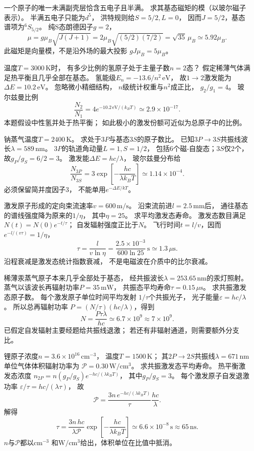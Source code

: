 一个原子的唯一未满副壳层恰含五电子且半满。
求其基态磁矩的模（以玻尔磁子表示）。
\exsolution
半满五电子只能为$d^5$，
洪特规则给$S=5/2,L=0$，
因而$J=5/2$，基态谱项为\({}^{6}S_{5/2}\)。
纯S态朗德因子$g=2$，
\[
 \boxed{\mu=g\mu_B\sqrt{J(J+1)}
 =2\mu_B\sqrt{(5/2)(7/2)}
 =\sqrt{35}\,\mu_B\simeq5.92\mu_B}.
\]
\excheck 此磁矩是向量模，不是沿外场的最大投影
$gJ\mu_B=5\mu_B$。

温度$T=3000\,\mathrm K$时，
有多少比例的氢原子处于主量子数$n=2$态？
假定稀薄气体满足热平衡且几乎全部在基态。
\exsolution
氢能级$E_n=-13.6/n^2\,\mathrm{eV}$，
故$1\to2$激发能为$\Delta E=10.2\,\mathrm{eV}$。
忽略微小精细结构，
$n$级统计权重与$n^2$成正比，
$g_2/g_1=4$。
玻尔兹曼比例
\[
 \boxed{\frac{N_2}{N_1}=
 4e^{-10.2\,\mathrm{eV}/(k_BT)}
 \simeq2.9\times10^{-17}}.
\]
\excheck 本题假设中性氢并处于热平衡；
如此极小的激发份额可近似为总原子中的比例。

钠蒸气温度$T=2400\,\mathrm K$。
求处于$3P$与基态$3S$的原子数比。
已知$3P\to3S$共振线波长$\lambda=589\,\mathrm{nm}$。
\exsolution
$3P$的轨道角动量$L=1,S=1/2$，
包括6个磁-自旋态；$3S$仅2个，
故$g_P/g_S=6/2=3$。
激发能$\Delta E=hc/\lambda$，
玻尔兹曼分布给
\[
 \boxed{\frac{N_{3P}}{N_{3S}}=
 3\exp\!\left[-\frac{hc}{\lambda k_BT}\right]
 \simeq1.14\times10^{-4}}.
\]
\excheck 必须保留简并度因子3，
不能单用$e^{-\Delta E/kT}$。

激发原子形成的定向束流速率$v=600\,\mathrm{m/s}$。
沿束流前进$l=2.5\,\mathrm{mm}$后，
通往基态的谱线强度降为原来的$1/\eta$，
其中$\eta=25$。
求平均激发态寿命。
\exsolution
激发态数目满足
$N(t)=N(0)e^{-t/\tau}$；
自发辐射强度正比于$N$。
飞行时间$t=l/v$，因而
$e^{-l/(v\tau)}=1/\eta$，
\[
 \boxed{\tau=\frac l{v\ln\eta}
 =\frac{2.5\times10^{-3}}
 {600\ln25}\,\mathrm s\simeq1.3\,\mu\mathrm s}.
\]
\excheck 沿程衰减是激发态统计指数衰减，
不是电磁波在介质中的比尔衰减。

稀薄汞蒸气原子本来几乎全部处于基态，
经共振波长$\lambda=253.65\,\mathrm{nm}$的汞灯照射。
蒸气以该波长再辐射功率$P=35\,\mathrm{mW}$，
共振态平均寿命$\tau=0.15\,\mu\mathrm s$。
求共振激发态原子数。
\exsolution
每个激发原子单位时间平均发射
$1/\tau$个共振光子，
光子能量$\varepsilon=hc/\lambda$。
所以总再辐射功率
$P=(N/\tau)(hc/\lambda)$，得到
\[
 \boxed{N=\frac{P\tau\lambda}{hc}
 \simeq6.7\times10^{9}\approx7\times10^9}.
\]
\excheck 已假定自发辐射主要经题给共振线退激；
若还有非辐射通道，则需要额外分支比。

锂原子浓度$n=3.6\times10^{16}\,\mathrm{cm^{-3}}$，
温度$T=1500\,\mathrm K$；
其$2P\to2S$共振线$\lambda=671\,\mathrm{nm}$
单位气体体积辐射功率为
$\mathcal P=0.30\,\mathrm{W/cm^3}$。
求共振激发态平均寿命。
\exsolution
热平衡激发态浓度
$n_{2P}=n(g_P/g_S)e^{-hc/(\lambda k_BT)}$，
其中$g_P/g_S=3$。
每个激发原子自发退激功率
$\varepsilon/\tau=hc/(\lambda\tau)$，
故
\[
 \mathcal P=
 \frac{3n\,e^{-hc/(\lambda k_BT)}}{\tau}
 \frac{hc}{\lambda}.
\]
解得
\[
 \boxed{\tau=
 \frac{3n\,hc}{\lambda\mathcal P}
 \exp\!\left[-\frac{hc}{\lambda k_BT}\right]
 \simeq6.6\times10^{-8}\,\mathrm s
 \approx65\,\mathrm{ns}}.
\]
\excheck $n$与$\mathcal P$都以$\mathrm{cm^{-3}}$
和$\mathrm{W/cm^3}$给出，体积单位在比值中抵消。

